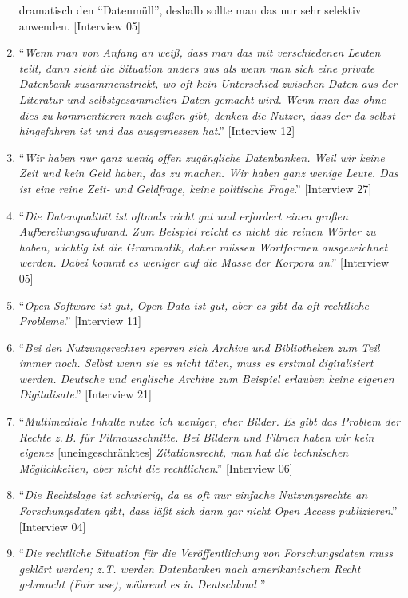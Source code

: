 \documentclass[a4paper,
fontsize=11pt,
oneside,
numbers=noperiodatend,
parskip=half-,
bibliography=totoc,
final
]{scrartcl}
\begin{document}
\begin{enumerate}
{{  dramatisch den \enquote{Datenmüll}, deshalb sollte man das nur sehr
  selektiv anwenden}.} {[}Interview 05{]}
\item
  \enquote{\emph{Wenn man von Anfang an weiß, dass man das mit
  verschiedenen Leuten teilt, dann sieht die Situation anders aus als
  wenn man sich eine private Datenbank zusammenstrickt, wo oft kein
  Unterschied zwischen Daten aus der Literatur und selbstgesammelten
  Daten gemacht wird. Wenn man das ohne dies zu kommentieren nach außen
  gibt, denken die Nutzer, dass der da selbst hingefahren ist und das
  ausgemessen hat}.} {[}Interview 12{]}
\item
  \enquote{\emph{Wir haben nur ganz wenig offen zugängliche Datenbanken.
  Weil wir keine Zeit und kein Geld haben, das zu machen. Wir haben ganz
  wenige Leute. Das ist eine reine Zeit- und Geldfrage, keine politische
  Frage}.} {[}Interview 27{]}
\item
  \enquote{\emph{Die Datenqualität ist oftmals nicht gut und erfordert
  einen großen Aufbereitungsaufwand. Zum Beispiel reicht es nicht die
  reinen Wörter zu haben, wichtig ist die Grammatik, daher müssen
  Wortformen ausgezeichnet werden. Dabei kommt es weniger auf die Masse
  der Korpora an}.} {[}Interview 05{]}
\item
  \enquote{\emph{Open Software ist gut, Open Data ist gut, aber es gibt
  da oft rechtliche Probleme}.} {[}Interview 11{]}
\item
  \enquote{\emph{Bei den Nutzungsrechten sperren sich Archive und
  Bibliotheken zum Teil immer noch. Selbst wenn sie es nicht täten, muss
  es erstmal digitalisiert werden. Deutsche und englische Archive zum
  Beispiel erlauben keine eigenen Digitalisate}.} {[}Interview 21{]}
\item
  \enquote{\emph{Multimediale Inhalte nutze ich weniger, eher Bilder. Es
  gibt das Problem der Rechte z.\,B. für Filmausschnitte. Bei Bildern und
  Filmen haben wir kein eigenes} {[}uneingeschränktes{]}
  \emph{Zitationsrecht, man hat die technischen Möglichkeiten, aber
  nicht die rechtlichen}.} {[}Interview 06{]}
\item
  \enquote{\emph{Die Rechtslage ist schwierig, da es oft nur einfache
  Nutzungsrechte an Forschungsdaten gibt, dass läßt sich dann gar nicht
  Open Access publizieren}.} {[}Interview 04{]}
\item
  \enquote{\emph{Die rechtliche Situation für die Veröffentlichung von
  Forschungsdaten muss geklärt werden; z.T. werden Datenbanken nach
  amerikanischem Recht gebraucht (Fair use), während es in Deutschland
}}
\end{enumerate}
\end{document}
